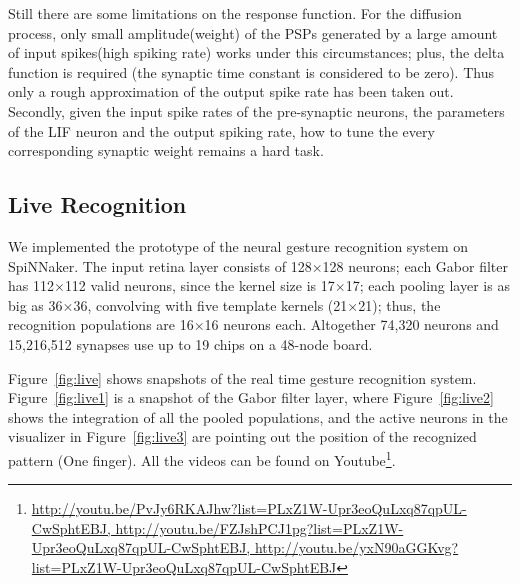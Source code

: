 \documentclass[journal]{journal}
\begin{document}
Still there are some limitations on the response function. 
For the diffusion process, only small amplitude(weight) of the PSPs generated by a large amount of input spikes(high spiking rate) works under this circumstances; 
plus, the delta function is required (the synaptic time constant is considered to be zero). Thus only a rough approximation of the output spike rate has been taken out.
Secondly, given the input spike rates of the pre-synaptic neurons, the parameters of the LIF neuron and the output spiking rate, how to tune the every corresponding synaptic weight remains a hard task.


\subsection{Live Recognition}
We implemented the prototype of the neural gesture recognition system on SpiNNaker. 
The input retina layer consists of 128$\times$128 neurons; 
each Gabor filter has 112$\times$112 valid neurons, since the kernel size is 17$\times$17; 
each pooling layer is as big as 36$\times$36, convolving with five template kernels (21$\times$21); 
thus, the recognition populations are 16$\times$16 neurons each. Altogether 74,320 neurons and 15,216,512 synapses use up to 19 chips on a 48-node board.

Figure~\ref{fig:live} shows snapshots of the real time gesture recognition system. 
Figure~\ref{fig:live1} is a snapshot of the Gabor filter layer, where Figure~\ref{fig:live2} shows the integration of all the pooled populations, and the active neurons in the visualizer in Figure~\ref{fig:live3} are pointing out the position of the recognized pattern (One finger). 
All the videos can be found on Youtube\footnote{\url{
http://youtu.be/PvJy6RKAJhw?list=PLxZ1W-Upr3eoQuLxq87qpUL-CwSphtEBJ, http://youtu.be/FZJshPCJ1pg?list=PLxZ1W-Upr3eoQuLxq87qpUL-CwSphtEBJ, http://youtu.be/yxN90aGGKvg?list=PLxZ1W-Upr3eoQuLxq87qpUL-CwSphtEBJ}}.
\end{document}
